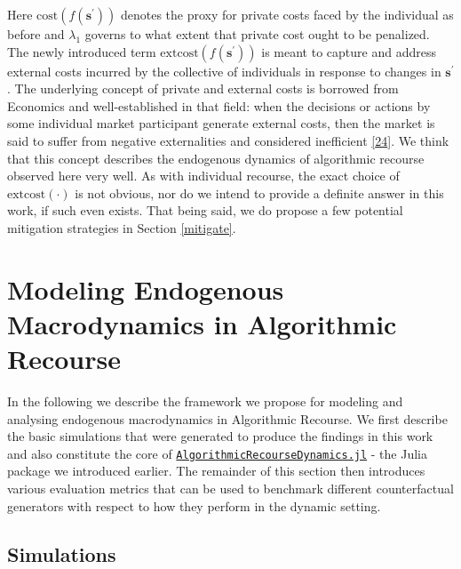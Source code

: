 \documentclass[conference,final,]{IEEEtran}
\theoremstyle{definition}
\theoremstyle{definition}
\theoremstyle{definition}
\theoremstyle{definition}
\theoremstyle{remark}
\begin{document}
Here \(\text{cost}(f(\mathbf{s}^\prime))\) denotes the proxy for private costs faced by the individual as before and \(\lambda_1\) governs to what extent that private cost ought to be penalized. The newly introduced term \(\text{extcost}(f(\mathbf{s}^\prime))\) is meant to capture and address external costs incurred by the collective of individuals in response to changes in \(\mathbf{s}^\prime\). The underlying concept of private and external costs is borrowed from Economics and well-established in that field: when the decisions or actions by some individual market participant generate external costs, then the market is said to suffer from negative externalities and considered inefficient \protect\hyperlink{ref-pindyck2014microeconomics}{{[}24{]}}. We think that this concept describes the endogenous dynamics of algorithmic recourse observed here very well. As with individual recourse, the exact choice of \(\text{extcost}(\cdot)\) is not obvious, nor do we intend to provide a definite answer in this work, if such even exists. That being said, we do propose a few potential mitigation strategies in Section \ref{mitigate}.

\hypertarget{method-2}{%
\section{Modeling Endogenous Macrodynamics in Algorithmic Recourse}\label{method-2}}

In the following we describe the framework we propose for modeling and analysing endogenous macrodynamics in Algorithmic Recourse. We first describe the basic simulations that were generated to produce the findings in this work and also constitute the core of \href{https://anonymous.4open.science/r/AlgorithmicRecourseDynamics/README.md}{\texttt{AlgorithmicRecourseDynamics.jl}} - the Julia package we introduced earlier. The remainder of this section then introduces various evaluation metrics that can be used to benchmark different counterfactual generators with respect to how they perform in the dynamic setting.

\hypertarget{method-2-experiment}{%
\subsection{Simulations}\label{method-2-experiment}}
\end{document}
